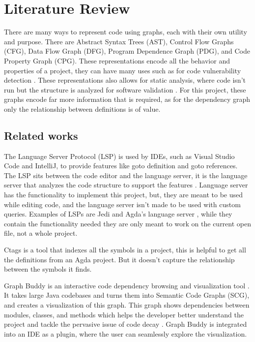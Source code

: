 
\chapter{Literature Review}


There are many ways to represent code using graphs, each with their own utility
and purpose. There are Abstract Syntax Trees (AST), Control Flow Graphs (CFG),
Data Flow Graph (DFG), Program Dependence Graph (PDG), and Code Property Graph
(CPG). These representations encode all the behavior and properties of a
project, they can have many uses such as for code vulnerability detection
\cite{graph_for_code_vuln}. These representations also allows for static
analysis, where code isn't run but the structure is analyzed for software
validation \cite{static_analysis}. For this project, these graphs encode far
more information that is required, as for the dependency graph only the
relationship between definitions is of value. 



\section{Related works}

The Language Server Protocol (LSP) is used by IDEs, such as Visual Studio Code
and IntelliJ, to provide features like goto definition and goto references. The
LSP sits between the code editor and the language server, it is the language
server that analyzes the code structure to support the features
\cite{LSP_implementation}. Language server has the functionality to implement
this project, but, they are meant to be used while editing code, and the
language server isn't made to be used with custom queries. Examples of LSPs
are Jedi \cite{jedi_lsp} and Agda's language server \cite{agda_lsp}, while they
contain the functionality needed they are only meant to work on the current
open file, not a whole project.

Ctags \cite{ctags} is a tool that indexes all the symbols in a project, this is
helpful to get all the definitions from an Agda project. But it doesn't capture
the relationship between the symbols it finds.

Graph Buddy is an interactive code dependency browsing and visualization tool
\cite{graph_buddy}. It takes large Java codebases and turns them into Semantic Code
Graphs (SCG), and creates a visualization of this graph. This graph shows
dependencies between modules, classes, and methods which helps the developer
better understand the project and tackle the pervasive issue of code decay
\cite{code_decay_evidence}. Graph Buddy is integrated into an IDE as a plugin,
where the user can seamlessly explore the visualization. 

